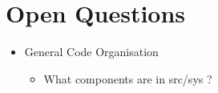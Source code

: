 \documentclass[12pt,pdftex,a4paper]{scrbook}
\begin{document}
	\chapter{Open Questions}

	\begin{itemize}
		\item General Code Organisation
		\begin{itemize}
			\item What components are in src/sys ?
			
		\end{itemize}
	\end{itemize}
\end{document}
